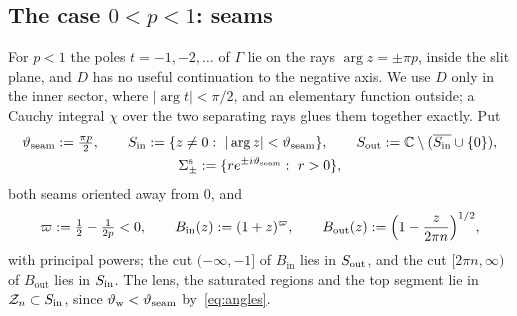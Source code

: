 \subsection{\texorpdfstring{The case $0<p<1$: seams}{The case 0<p<1: seams}}\label{sec:outer-plt1}
For $p<1$ the poles $t=-1,-2,\dots$ of $\Gamma$ lie on the rays $\arg z=\pm\pi p$, inside the slit plane, and $D$ has
no useful continuation to the negative axis. We use $D$ only in the inner sector, where $|\arg t|<\pi/2$, and an
elementary function outside; a Cauchy integral $\chi$ over the two separating rays glues them together exactly. Put
\begin{gather*}
  \vartheta_{\mathrm{seam}}:=\tfrac{\pi p}2,\qquad S_{\mathrm{in}}:=\{z\ne0:\ |\arg z|<\vartheta_{\mathrm{seam}}\},\qquad S_{\mathrm{out}}:=\mathbb{C}\setminus(\overline{S_{\mathrm{in}}}\cup\{0\}),\\
  \Sigma^{\mathrm{s}}_\pm:=\{re^{\pm i\vartheta_{\mathrm{seam}}}:\ r>0\},
\end{gather*}
both seams oriented away from $0$, and
\[
  \varpi:=\tfrac12-\tfrac1{2p}<0,\qquad B_{\mathrm{in}}(z):=(1+z)^{\varpi},\qquad B_{\mathrm{out}}(z):=\Bigl(1-\frac z{2\pi n}\Bigr)^{1/2},
\]
with principal powers; the cut $(-\infty,-1]$ of $B_{\mathrm{in}}$ lies in $S_{\mathrm{out}}$, and the cut $[2\pi n,\infty)$ of
$B_{\mathrm{out}}$ lies in $S_{\mathrm{in}}$. The lens, the saturated regions and the top segment lie in $\mathcal{Z}_n\subset S_{\mathrm{in}}$, since
$\vartheta_{\mathrm{w}}<\vartheta_{\mathrm{seam}}$ by~\eqref{eq:angles}.

